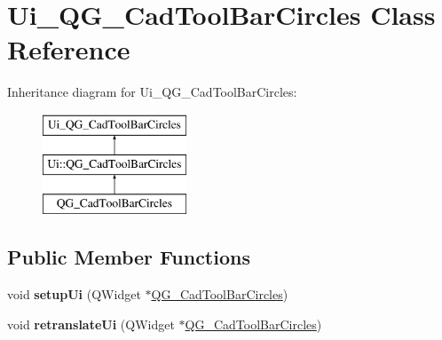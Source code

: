 \hypertarget{classUi__QG__CadToolBarCircles}{\section{Ui\-\_\-\-Q\-G\-\_\-\-Cad\-Tool\-Bar\-Circles Class Reference}
\label{classUi__QG__CadToolBarCircles}
}
Inheritance diagram for Ui\-\_\-\-Q\-G\-\_\-\-Cad\-Tool\-Bar\-Circles\-:\begin{figure}[H]
\begin{center}
\leavevmode
\includegraphics[height=3.000000cm]{classUi__QG__CadToolBarCircles}
\end{center}
\end{figure}
\subsection*{Public Member Functions}
\begin{DoxyCompactItemize}
\item 
\hypertarget{classUi__QG__CadToolBarCircles_a7cbbf249fadb32a8ca19e0396b52b23e}{void {\bfseries setup\-Ui} (Q\-Widget $\ast$\hyperlink{classQG__CadToolBarCircles}{Q\-G\-\_\-\-Cad\-Tool\-Bar\-Circles})}\label{classUi__QG__CadToolBarCircles_a7cbbf249fadb32a8ca19e0396b52b23e}

\item 
\hypertarget{classUi__QG__CadToolBarCircles_a0d4748f3e28943e9d102e86e5411da27}{void {\bfseries retranslate\-Ui} (Q\-Widget $\ast$\hyperlink{classQG__CadToolBarCircles}{Q\-G\-\_\-\-Cad\-Tool\-Bar\-Circles})}\label{classUi__QG__CadToolBarCircles_a0d4748f3e28943e9d102e86e5411da27}

\end{DoxyCompactItemize}
